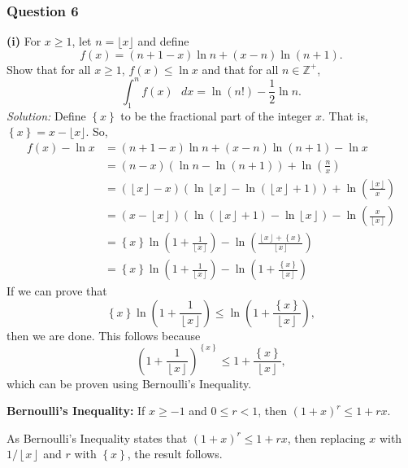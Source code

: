 \documentclass{article}
\begin{document}
\subsubsection*{Question 6}
\textbf{(i)} For $x \ge 1$, let $n=\lfloor{x}\rfloor$ and define \[f(x)=(n+1-x)\operatorname{ln}n+(x-n)\operatorname{ln}(n+1).\] Show that for all $x \ge 1$, $f(x) \le \operatorname{ln}x$ and that for all $n\in\mathbb{Z}^+$, \[\int_{1}^{n}f(x)\text{ }dx=\operatorname{ln}(n!)-\frac{1}{2}\operatorname{ln}n.\]
\textit{Solution:} Define $\left\{x\right\}$ to be the fractional part of the integer $x$. That is, $\left\{x\right\}=x-\lfloor{x}\rfloor$. So, 		\begin{align*}
   f\left( x \right)-\ln x&=(n+1-x)\ln n+(x-n)\ln (n+1)-\ln x \\ 
 & =\left( n-x \right)\left( \ln n-\ln \left( n+1 \right) \right)+\ln \left( \frac{n}{x} \right) \\ 
 & =\left( \left\lfloor x \right\rfloor -x \right)\left( \ln \left\lfloor x \right\rfloor -\ln \left( \left\lfloor x \right\rfloor +1 \right) \right)+\ln \left( \frac{\left\lfloor x \right\rfloor }{x} \right) \\ 
 & =\left( x-\left\lfloor x \right\rfloor  \right)\left( \ln \left( \left\lfloor x \right\rfloor +1 \right)-\ln \left\lfloor x \right\rfloor  \right)-\ln \left( \frac{x}{\left\lfloor x \right\rfloor } \right) \\ 
 & =\left\{ x \right\}\ln \left( 1+\frac{1}{\left\lfloor x \right\rfloor } \right)-\ln \left( \frac{\left\lfloor x \right\rfloor +\left\{ x \right\}}{\left\lfloor x \right\rfloor } \right) \\ 
 & =\left\{ x \right\}\ln \left( 1+\frac{1}{\left\lfloor x \right\rfloor } \right)-\ln \left( 1+\frac{\left\{ x \right\}}{\left\lfloor x \right\rfloor } \right)  
\end{align*}
If we can prove that \[\left\{ x \right\}\ln \left( 1+\frac{1}{\left\lfloor x \right\rfloor } \right)\le \ln \left( 1+\frac{\left\{ x \right\}}{\left\lfloor x \right\rfloor } \right),\] then we are done. This follows because \[{{\left( 1+\frac{1}{\left\lfloor x \right\rfloor } \right)}^{\left\{ x \right\}}}\le 1+\frac{\left\{ x \right\}}{\left\lfloor x \right\rfloor },\] which can be proven using Bernoulli's Inequality.
\begin{mybox}
    \textbf{Bernoulli's Inequality:} If $x\ge -1$ and $0\le r<1$, then $(1+x)^r\le 1+rx$.
\end{mybox}
As Bernoulli's Inequality states that $(1+x)^r \le 1+rx$, then replacing $x$ with $1/\left\lfloor x\right\rfloor$ and $r$ with $\left\{x\right\}$, the result follows. 
\end{document}
